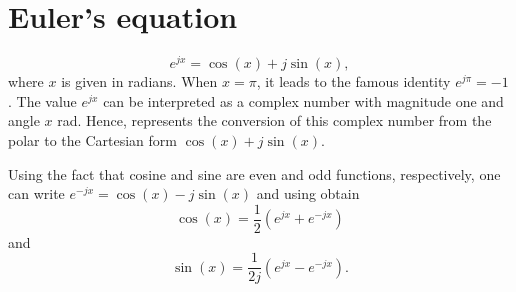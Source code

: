 
\section{Euler's equation}

\begin{equation}
e^{jx} = \cos(x) + j \sin(x),
\label{eq:euler}
\end{equation}
where $x$ is given in radians. When $x=\pi$, it leads to the famous identity $e^{j \pi}=-1$. The value $e^{jx}$ can be interpreted as a complex number with magnitude one and angle $x$ rad. Hence,  represents the conversion of this complex number from the polar to the Cartesian form $\cos(x) + j \sin(x)$. 

Using the fact that cosine and sine are even and odd functions, respectively, one can write $e^{-jx} = \cos(x) - j \sin(x)$ and using  obtain
\begin{equation}
\cos(x) = \frac{1}{2} (e^{jx} + e^{-jx})
\label{eq:cos_as_complex_exponentials}
\end{equation}
and
\begin{equation}
\sin(x) = \frac{1}{2j} (e^{jx} - e^{-jx}).
\label{eq:sin_as_complex_exponentials}
\end{equation}


